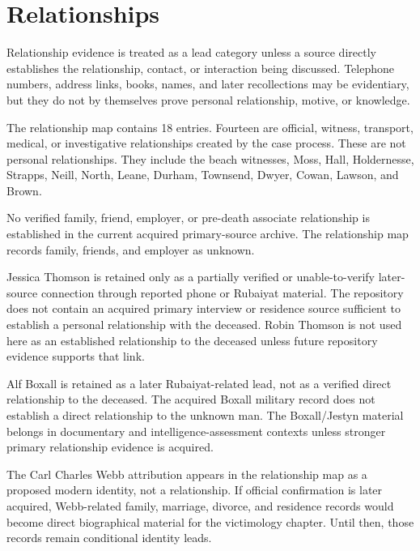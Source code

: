 \section{Relationships}

Relationship evidence is treated as a lead category unless a source directly establishes the relationship, contact, or interaction being discussed. Telephone numbers, address links, books, names, and later recollections may be evidentiary, but they do not by themselves prove personal relationship, motive, or knowledge.

The relationship map contains 18 entries. Fourteen are official, witness, transport, medical, or investigative relationships created by the case process. These are not personal relationships. They include the beach witnesses, Moss, Hall, Holdernesse, Strapps, Neill, North, Leane, Durham, Townsend, Dwyer, Cowan, Lawson, and Brown.

No verified family, friend, employer, or pre-death associate relationship is established in the current acquired primary-source archive. The relationship map records family, friends, and employer as unknown.

Jessica Thomson is retained only as a partially verified or unable-to-verify later-source connection through reported phone or Rubaiyat material. The repository does not contain an acquired primary interview or residence source sufficient to establish a personal relationship with the deceased. Robin Thomson is not used here as an established relationship to the deceased unless future repository evidence supports that link.

Alf Boxall is retained as a later Rubaiyat-related lead, not as a verified direct relationship to the deceased. The acquired Boxall military record does not establish a direct relationship to the unknown man. The Boxall/Jestyn material belongs in documentary and intelligence-assessment contexts unless stronger primary relationship evidence is acquired.

The Carl Charles Webb attribution appears in the relationship map as a proposed modern identity, not a relationship. If official confirmation is later acquired, Webb-related family, marriage, divorce, and residence records would become direct biographical material for the victimology chapter. Until then, those records remain conditional identity leads.

